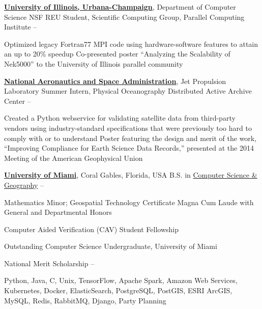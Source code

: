 \documentclass[letterpaper,MMMyyyy,nonstopmode]{simpleresumecv}
\begin{document}
\begin{Body}
\Entry
\href{http://illinois.edu/}{\textbf{University of Illinois, Urbana-Champaign}}, Department of Computer Science
\Gap
\BulletItem NSF REU Student, Scientific Computing Group, Parallel Computing Institute
\hfill {} -- 
\begin{Detail}
\SubBulletItem Optimized legacy Fortran77 MPI code using hardware-software features to attain an up to 20\% speedup
\SubBulletItem Co-presented poster ``Analyzing the Scalability of Nek5000'' to the University of Illinois parallel community
\end{Detail}

\Entry
\href{http://www.jpl.nasa.gov/}{\textbf{National Aeronautics and Space Administration}}, Jet Propulsion Laboratory
\Gap
\BulletItem Summer Intern, Physical Oceanography Distributed Active Archive Center
\hfill
{} -- 
\begin{Detail}
\SubBulletItem Created a Python webservice for validating satellite data from third-party vendors using industry-standard specifications that were previously too hard to comply with or to understand
\SubBulletItem Poster featuring the design and merit of the work, ``Improving Compliance for Earth Science Data Records,'' presented at the 2014 Meeting of the American Geophysical Union
\end{Detail}



\Entry
\href{http://welcome.miami.edu/}{\textbf{University of Miami}},
Coral Gables, Florida, USA
\Gap
\BulletItem
B.S. in \href{http://www.as.miami.edu/csc/}{Computer Science \& Geography}
\hfill
{} -- 
\begin{Detail}
\SubBulletItem Mathematics Minor; Geospatial Technology Certificate
\SubBulletItem Magna Cum Laude with General and Departmental Honors
\end{Detail}



\Gap
\BulletItem Computer Aided Verification (CAV) Student Fellowship
\hfill
{}

\Gap
\BulletItem Outstanding Computer Science Undergraduate, University of Miami
\hfill
{}

\Gap
\BulletItem National Merit Scholarship
\hfill
{} -- 


\Entry Python, Java, C, Unix, TensorFlow, Apache Spark, Amazon Web Services, Kubernetes, Docker, ElasticSearch, PostgreSQL, PostGIS, ESRI ArcGIS, MySQL, Redis, RabbitMQ, Django, Party Planning

\end{Body}
\end{document}
